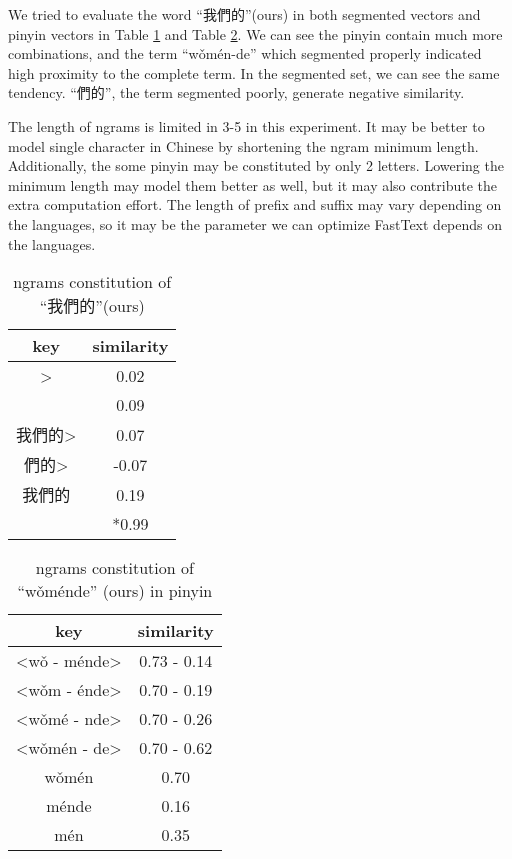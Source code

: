 We tried to evaluate the word \enquote{我們的}(ours) in both segmented vectors and pinyin vectors in Table \ref{table:ngrams-seg} and Table \ref{table:ngrams-pinyin}. 
We can see the pinyin contain much more combinations, and the term \enquote{wǒmén-de} which segmented properly indicated high proximity to the complete term. 
In the segmented set, we can see the same tendency. \enquote{們的}, the term segmented poorly, generate negative similarity. 

The length of ngrams is limited in 3-5 in this experiment. It may be better to model single character in Chinese by shortening the ngram minimum length.
Additionally, the some pinyin may be constituted by only 2 letters.  Lowering the minimum length may model them better as well, but it may also contribute the extra computation effort.
The length of prefix and suffix may vary depending on the languages, so it may be the parameter we can optimize FastText depends on the languages.

\begin{table}[]
\centering
\caption{ngrams constitution of \enquote{我們的}(ours)}
\label{table:ngrams-seg}
\begin{tabular}{|c|c|}
\hline
 key  &  similarity \\
\hline
{}\textgreater     &  0.02 \\
     &  0.09 \\
我們的\textgreater     &  0.07 \\
們的\textgreater     &  -0.07 \\
我們的     & 0.19   \\
     &  *0.99   \\   
\hline
\end{tabular}
\end{table}

\begin{table}[]
\centering
\caption{ngrams constitution of \enquote{wǒménde} (ours) in pinyin}
\label{table:ngrams-pinyin}
\begin{tabular}{|c|c|}
\hline
 key  &  similarity \\
\hline
\textless wǒ -  ménde\textgreater      &  0.73 - 0.14 \\
\textless wǒm -  énde\textgreater      &  0.70 - 0.19 \\
\textless wǒmé - nde\textgreater     &  0.70 - 0.26 \\
\textless wǒmén - de\textgreater      &  0.70 - 0.62\\
wǒmén      &  0.70 \\
  ménde     & 0.16   \\
mén     &  0.35   \\   
\hline
\end{tabular}
\end{table}

